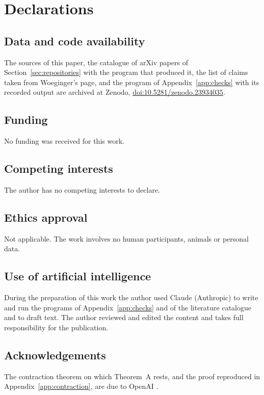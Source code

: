 \documentclass[11pt,reqno]{amsart}
\numberwithin{equation}{section}
\theoremstyle{plain}
\theoremstyle{definition}
\theoremstyle{remark}
\newcommand{\oai}{OpenAI}
\newcommand{\zenodoDOI}{10.5281/zenodo.23934035}
\begin{document}
\section*{Declarations}

\subsection*{Data and code availability}
The sources of this paper, the catalogue of arXiv papers of
Section~\ref{sec:repositories} with the program that produced it, the list of
claims taken from Woeginger's page, and the program of
Appendix~\ref{app:checks} with its recorded output are archived at Zenodo,
\href{https://doi.org/\zenodoDOI}{doi:\zenodoDOI}.

\subsection*{Funding}
No funding was received for this work.

\subsection*{Competing interests}
The author has no competing interests to declare.

\subsection*{Ethics approval}
Not applicable. The work involves no human participants, animals or personal
data.

\subsection*{Use of artificial intelligence}
During the preparation of this work the author used Claude (Anthropic) to write
and run the programs of Appendix~\ref{app:checks} and of the literature
catalogue and to draft text. The author reviewed and edited the content and
takes full responsibility for the publication.

\subsection*{Acknowledgements}
The contraction theorem on which Theorem~A rests, and the proof reproduced in
Appendix~\ref{app:contraction}, are due to \oai{} \cite{OAI26}.
\end{document}
